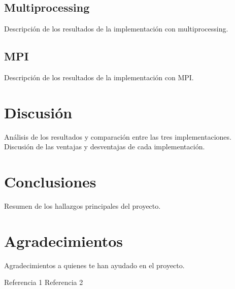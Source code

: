\documentclass[conference]{IEEEtran}
\begin{document}
\subsection{Multiprocessing}
Descripción de los resultados de la implementación con multiprocessing.

\subsection{MPI}
Descripción de los resultados de la implementación con MPI.

\section{Discusión}
Análisis de los resultados y comparación entre las tres implementaciones. Discusión de las ventajas y desventajas de cada implementación.

\section{Conclusiones}
Resumen de los hallazgos principales del proyecto.

\section*{Agradecimientos}
Agradecimientos a quienes te han ayudado en el proyecto.

\begin{thebibliography}{00}
 Referencia 1
 Referencia 2
\end{thebibliography}
\end{document}
